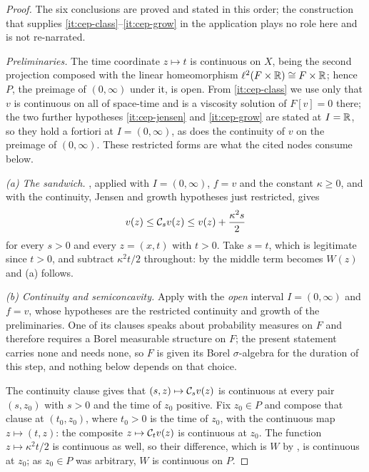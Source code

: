 \begin{proof}
The six conclusions are proved and stated in this order; the construction that
supplies \ref{it:cep-class}--\ref{it:cep-grow} in the application plays no
role here and is not re-narrated.

\emph{Preliminaries.} The time coordinate $z\mapsto t$ is continuous on $X$,
being the second projection composed with the linear homeomorphism
$\ell^2(F\times\mathbb{R})\cong F\times\mathbb{R}$; hence $P$, the preimage of $(0,\infty)$
under it, is open. From \ref{it:cep-class} we use only that $v$ is continuous
on all of space-time and is a viscosity solution of $F[v]=0$ there; the two
further hypotheses \ref{it:cep-jensen} and \ref{it:cep-grow} are stated at
$I=\mathbb{R}$, so they hold a fortiori at $I=(0,\infty)$, as does the continuity of
$v$ on the preimage of $(0,\infty)$. These restricted forms are what the cited
nodes consume below.

\emph{(a) The sandwich.} , applied with
$I=(0,\infty)$, $f=v$ and the constant $\kappa\ge0$, and with the continuity,
Jensen and growth hypotheses just restricted, gives
\begin{equation}\label{eq:cep-sand}
  v(z)\le\mathcal{C}_sv(z)\le v(z)+\frac{\kappa^2s}{2}
\end{equation}
for every $s>0$ and every $z=(x,t)$ with $t>0$. Take $s=t$, which is legitimate
since $t>0$, and subtract $\kappa^2t/2$ throughout: by  the
middle term becomes $W(z)$ and (a) follows.

\emph{(b) Continuity and semiconcavity.} Apply  with
the \emph{open} interval $I=(0,\infty)$ and $f=v$, whose hypotheses are the
restricted continuity and growth of the preliminaries. One of its clauses
speaks about probability measures on $F$ and therefore requires a Borel
measurable structure on $F$; the present statement carries none and needs
none, so $F$ is given its Borel $\sigma$-algebra for the duration of this
step, and nothing below depends on that choice.

The continuity clause gives that $(s,z)\mapsto\mathcal{C}_sv(z)$ is continuous at
every pair $(s,z_0)$ with $s>0$ and the time of $z_0$ positive. Fix $z_0\in P$
and compose that clause at $(t_0,z_0)$, where $t_0>0$ is the time of $z_0$,
with the continuous map $z\mapsto(t,z)$: the composite
$z\mapsto\mathcal{C}_tv(z)$ is continuous at $z_0$. The function
$z\mapsto\kappa^2t/2$ is continuous as well, so their difference, which is $W$
by , is continuous at $z_0$; as $z_0\in P$ was arbitrary,
$W$ is continuous on $P$.


\end{proof}
